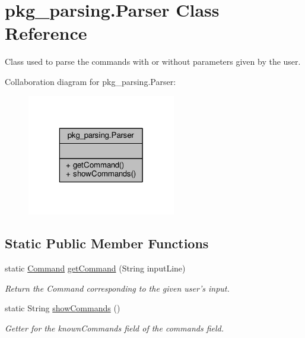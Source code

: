 \hypertarget{classpkg__parsing_1_1Parser}{\section{pkg\-\_\-parsing.\-Parser Class Reference}
\label{classpkg__parsing_1_1Parser}
}


Class used to parse the commands with or without parameters given by the user.  




Collaboration diagram for pkg\-\_\-parsing.\-Parser\-:
\nopagebreak
\begin{figure}[H]
\begin{center}
\leavevmode
\includegraphics[width=184pt]{classpkg__parsing_1_1Parser__coll__graph}
\end{center}
\end{figure}
\subsection*{Static Public Member Functions}
\begin{DoxyCompactItemize}
\item 
static \hyperlink{classpkg__commands_1_1Command}{Command} \hyperlink{classpkg__parsing_1_1Parser_a3baac59980671aeb689ca25fba64e9cc}{get\-Command} (String input\-Line)
\begin{DoxyCompactList}\small\item\em Return the Command corresponding to the given user's input. \end{DoxyCompactList}\item 
static String \hyperlink{classpkg__parsing_1_1Parser_a31545cdbdb409aaeb727289c0ea7be1b}{show\-Commands} ()
\begin{DoxyCompactList}\small\item\em Getter for the known\-Commands field of the commands field. \end{DoxyCompactList}\end{DoxyCompactItemize}


